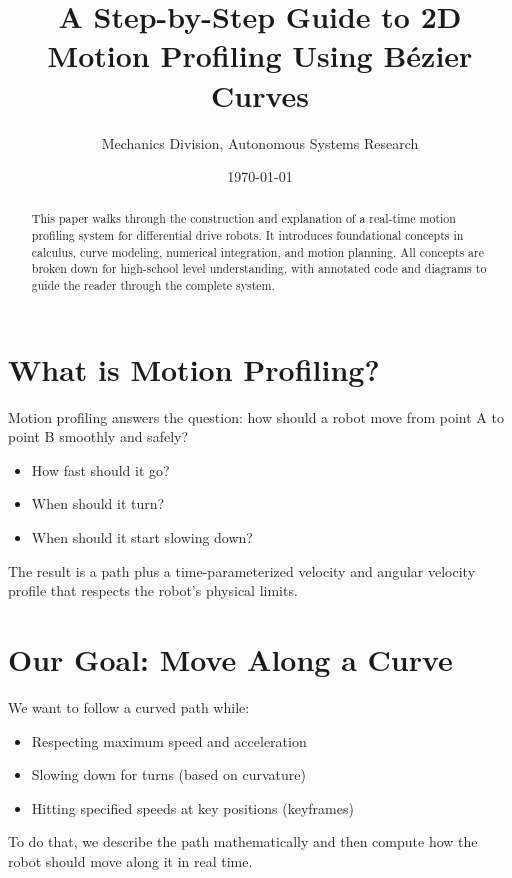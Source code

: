 \documentclass[11pt]{article}
\title{A Step-by-Step Guide to 2D Motion Profiling Using Bézier Curves}
\author{Mechanics Division, Autonomous Systems Research}
\date{\today}
\begin{document}
\maketitle

\begin{abstract}
This paper walks through the construction and explanation of a real-time motion profiling system for differential drive robots. It introduces foundational concepts in calculus, curve modeling, numerical integration, and motion planning. All concepts are broken down for high-school level understanding, with annotated code and diagrams to guide the reader through the complete system.
\end{abstract}

\tableofcontents
\newpage

\section{What is Motion Profiling?}

Motion profiling answers the question: how should a robot move from point A to point B smoothly and safely?

\begin{itemize}
  \item How fast should it go?
  \item When should it turn?
  \item When should it start slowing down?
\end{itemize}

The result is a path plus a time-parameterized velocity and angular velocity profile that respects the robot’s physical limits.

\section{Our Goal: Move Along a Curve}
\label{sec:goal}

We want to follow a curved path while:
\begin{itemize}
  \item Respecting maximum speed and acceleration
  \item Slowing down for turns (based on curvature)
  \item Hitting specified speeds at key positions (keyframes)
\end{itemize}

To do that, we describe the path mathematically and then compute how the robot should move along it in real time.
\end{document}
